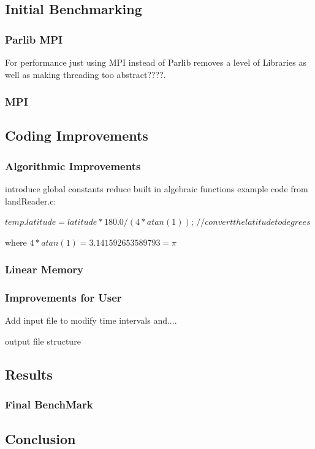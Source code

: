 \documentclass[]{article}%
\begin{document}
\subsection{Initial Benchmarking}
\subsubsection{Parlib MPI}

For performance just using MPI instead of Parlib removes a level of Libraries as well as making threading too abstract????.

\subsubsection{MPI}

\subsection{Coding Improvements}
\subsubsection{Algorithmic Improvements}
introduce global constants
reduce built in algebraic functions
example code from landReader.c:

$temp.latitude = latitude*180.0/(4*atan(1))$;	$//convert the latitude to degrees	$

where $4*atan(1) = 3.141592653589793 = \pi$

\subsubsection{Linear Memory}


\subsubsection{Improvements for User}
Add input file to modify time intervals and....

output file structure



\subsection{Results}
\subsubsection{Final BenchMark}

\subsection{Conclusion}
\end{document}
